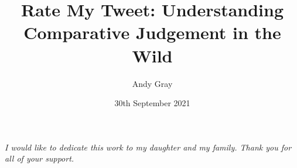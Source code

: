 \documentclass[11pt, a4paper, twoside, openright]{custard}
\begin{document}
	
	\title{Rate My Tweet: Understanding Comparative Judgement in the Wild}
	\author{Andy Gray}
	
	
	
	\date{30th September 2021}
	
	\frontmatter
	\maketitle
	\declaration
	\cleardoublepage
	
	\ifdraftdoc\else
	\begin{vplace}[0.7]
		\begin{large}
			\begin{center}
				\textit{I would like to dedicate this work to my daughter and my family. Thank you for all of your support.}
			\end{center}
		\end{large}
	\end{vplace}
	\fi
\end{document}
